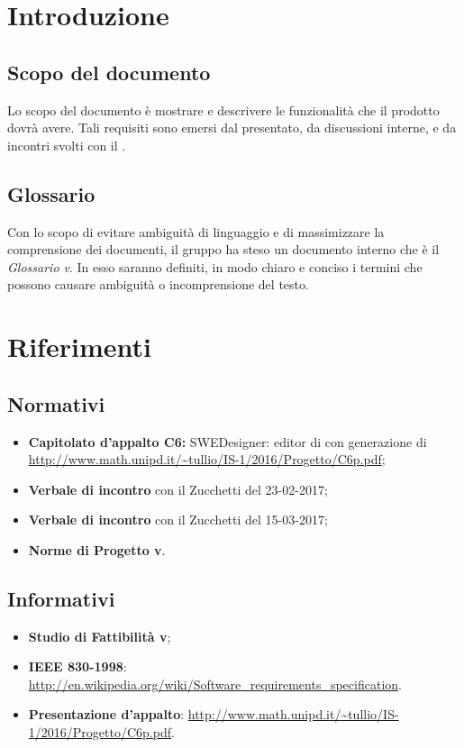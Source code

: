 \section{Introduzione}
\subsection{Scopo del documento}
Lo scopo del documento è mostrare e descrivere le funzionalità che il prodotto dovrà avere. Tali requisiti sono emersi dal  presentato, da discussioni interne, e da incontri svolti con il .

\subsection{Glossario}
          Con lo scopo di evitare ambiguità di linguaggio e di massimizzare la comprensione dei documenti, il
          gruppo ha steso un documento interno che è il \emph{Glossario v\VersioneG{}}. In esso saranno definiti, in modo
          chiaro e conciso i termini che possono causare ambiguità o incomprensione del testo.
  \newpage
\section{Riferimenti}
\subsection{Normativi}
\begin{itemize}
\item \textbf{Capitolato d'appalto C6:} SWEDesigner: editor di   con generazione di  \\
\url{http://www.math.unipd.it/~tullio/IS-1/2016/Progetto/C6p.pdf};
\item \textbf{Verbale di incontro} con il  Zucchetti del 23-02-2017;
\item \textbf{Verbale di incontro} con il  Zucchetti del 15-03-2017;
\item \textbf{Norme di Progetto v\VersioneNP{}}.
\end{itemize}
\subsection{Informativi}
\begin{itemize}
\item \textbf{Studio di Fattibilità v\VersioneSF{}};
\item \textbf{IEEE 830-1998}: \url{http://en.wikipedia.org/wiki/Software_requirements_specification}.
\item \textbf{Presentazione  d'appalto}: \url{http://www.math.unipd.it/~tullio/IS-1/2016/Progetto/C6p.pdf}.
\end{itemize}
\newpage
